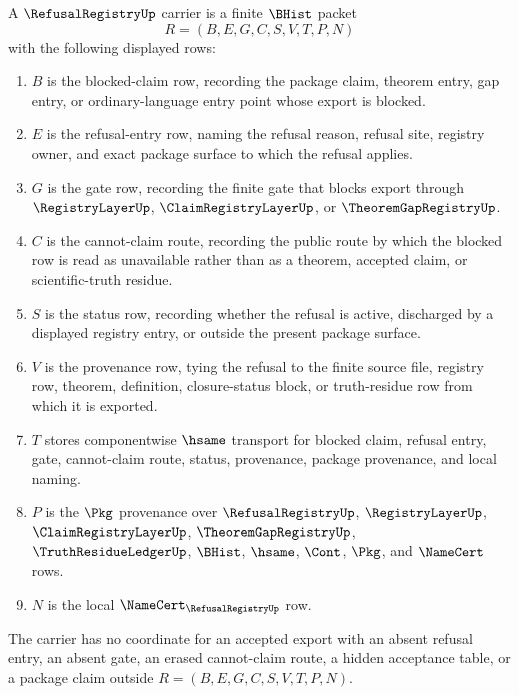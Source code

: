\begin{definition}
\label{def:refusal-registry-carrier}
A $\RefusalRegistryUp$ carrier is a finite $\BHist$ packet
$$
R=(B,E,G,C,S,V,T,P,N)
$$
with the following displayed rows:
\begin{enumerate}
\item $B$ is the blocked-claim row, recording the package claim, theorem entry, gap entry, or ordinary-language entry point whose export is blocked.
\item $E$ is the refusal-entry row, naming the refusal reason, refusal site, registry owner, and exact package surface to which the refusal applies.
\item $G$ is the gate row, recording the finite gate that blocks export through $\RegistryLayerUp$, $\ClaimRegistryLayerUp$, or $\TheoremGapRegistryUp$.
\item $C$ is the cannot-claim route, recording the public route by which the blocked row is read as unavailable rather than as a theorem, accepted claim, or scientific-truth residue.
\item $S$ is the status row, recording whether the refusal is active, discharged by a displayed registry entry, or outside the present package surface.
\item $V$ is the provenance row, tying the refusal to the finite source file, registry row, theorem, definition, closure-status block, or truth-residue row from which it is exported.
\item $T$ stores componentwise $\hsame$ transport for blocked claim, refusal entry, gate, cannot-claim route, status, provenance, package provenance, and local naming.
\item $P$ is the $\Pkg$ provenance over $\RefusalRegistryUp$, $\RegistryLayerUp$, $\ClaimRegistryLayerUp$, $\TheoremGapRegistryUp$, $\TruthResidueLedgerUp$, $\BHist$, $\hsame$, $\Cont$, $\Pkg$, and $\NameCert$ rows.
\item $N$ is the local $\NameCert_{\RefusalRegistryUp}$ row.
\end{enumerate}
The carrier has no coordinate for an accepted export with an absent refusal entry, an absent gate, an erased cannot-claim route, a hidden acceptance table, or a package claim outside $R=(B,E,G,C,S,V,T,P,N)$.
\end{definition}

